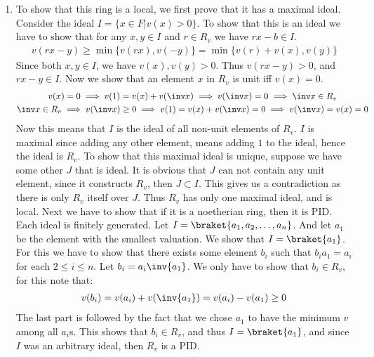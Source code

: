 \begin{enumerate}[label=\ilabel]
    \item 
        To show that this ring is a local, we first prove that it has a maximal ideal. Consider the ideal $I = \{ x \in F | v(x) > 0 \}$. To show that this is an ideal we have to show that for any $x, y \in I$ and $r \in R_v$ we have $rx - b \in I$. 
        \begin{gather*}
            v(rx - y) \ge \min \{v(rx), v(-y) \} = \min \{v(r) + v(x) , v(y) \}
        \end{gather*}
        Since both $x, y \in I$, we have $v(x), v(y) > 0$. Thus $v(rx - y) > 0$, and $rx - y \in I$.
        Now we show that an element $x$ in $R_v$ is unit iff $v(x) = 0$.
        \begin{gather*}
            v(x) = 0 \implies v(1) = v(x) + v(\inv x) \implies v(\inv x) = 0 \implies \inv x \in R_v \\
            \inv x \in R_v \implies v(\inv x) \ge 0 \implies v(1) = v(x) + v(\inv x) = 0 \implies v(\inv x) = v(x) = 0
        \end{gather*}
        Now this means that $I$ is the ideal of all non-unit elements of $R_v$. $I$ is maximal since adding any other element, means adding $1$ to the ideal, hence the ideal is $R_v$. To show that this maximal ideal is unique, suppose we have some other $J$ that is ideal. It is obvious that $J$ can not contain any unit element, since it constructs $R_v$, then $J \subset I$. This gives us a contradiction as there is only $R_v$ itself over $J$. Thus $R_v$ has only one maximal ideal, and is local. Next we have to show that if it is a noetherian ring, then it is PID. Each ideal is finitely generated. Let $I = \braket{a_1, a_2, \dots, a_n}$. And let $a_1$ be the element with the smallest valuation. We show that $I = \braket{a_1}$. For this we have to show that there exists some element $b_i$ such that $ b_i a_1 = a_i$ for each $2 \le i \le n$. Let $b_i = a_i \inv{a_1}$. We only have to show that $b_i \in R_v$, for this note that:
        \begin{gather*}
            v(b_i) = v(a_i) + v(\inv{a_1}) = v(a_i) - v(a_1) \ge 0
        \end{gather*}
        The last part is followed by the fact that we chose $a_1$ to have the minimum $v$ among all $a_i$s. This shows that $b_i \in R_v$, and thus $I = \braket{a_1}$, and since $I$ was an arbitrary ideal, then $R_v$ is a PID.
\end{enumerate}
